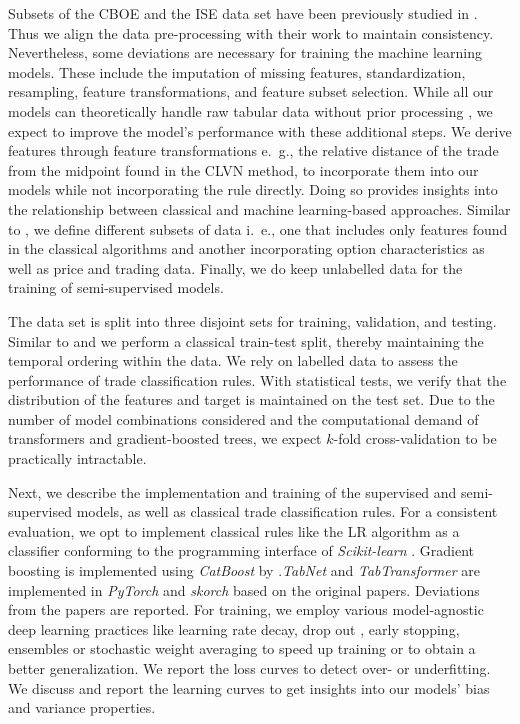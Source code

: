 Subsets of the \gls{CBOE} and the \gls{ISE} data set have been previously studied in \textcite{grauerOptionTradeClassification2022}. Thus we align the data pre-processing with their work to maintain consistency. Nevertheless, some deviations are necessary for training the machine learning models. These include the imputation of missing features, standardization, resampling, feature transformations, and feature subset selection. While all our models can theoretically handle raw tabular data without prior processing \autocites{arikTabNetAttentiveInterpretable2020}{prokhorenkovaCatBoostUnbiasedBoosting2018}{huangTabTransformerTabularData2020}, we expect to improve the model's performance with these additional steps. We derive features through feature transformations e.~g., the relative distance of the trade from the midpoint found in the CLVN method, to incorporate them into our models while not incorporating the rule directly. Doing so provides insights into the relationship between classical and machine learning-based approaches. Similar to \textcite{ronenMachineLearningTrade2022}, we define different subsets of data i.~e., one that includes only features found in the classical algorithms and another incorporating option characteristics as well as price and trading data. Finally, we do keep unlabelled data for the training of semi-supervised models.

The data set is split into three disjoint sets for training, validation, and testing. Similar to \textcite{ellisAccuracyTradeClassification2000} and \textcite{ronenMachineLearningTrade2022} we perform a classical train-test split, thereby maintaining the temporal ordering within the data. We rely on labelled data to assess the performance of trade classification rules. With statistical tests, we verify that the distribution of the features and target is maintained on the test set. Due to the number of model combinations considered and the computational demand of transformers and gradient-boosted trees, we expect $k$-fold cross-validation to be practically intractable.

Next, we describe the implementation and training of the supervised and semi-supervised models, as well as classical trade classification rules. 
For a consistent evaluation, we opt to implement classical rules like the LR algorithm as a classifier conforming to the programming interface of \textit{Scikit-learn} \autocite{pedregosaScikitlearnMachineLearning2018}.
Gradient boosting is implemented using \textit{CatBoost} by \textcite{prokhorenkovaCatBoostUnbiasedBoosting2018}.\textit{TabNet} and \textit{TabTransformer} are implemented in \textit{PyTorch} \autocite{paszkePyTorchImperativeStyle2019} and \textit{skorch} based on the original papers. Deviations from the papers are reported.
For training, we employ various model-agnostic deep learning practices like learning rate decay, drop out \autocite{hintonImprovingNeuralNetworks2012}, early stopping, ensembles \autocite{huangSnapshotEnsemblesTrain2017} or stochastic weight averaging \autocite{izmailovAveragingWeightsLeads2019} to speed up training or to obtain a better generalization. We report the loss curves to detect over- or underfitting. We discuss and report the learning curves to get insights into our models' bias and variance properties.  

